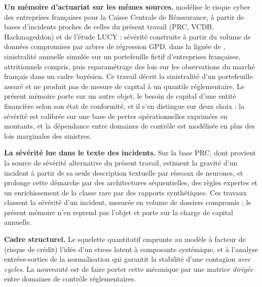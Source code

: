 \textbf{Un mémoire d'actuariat sur les mêmes sources.} \citet{Ranguin2024} modélise le risque
cyber des entreprises françaises pour la Caisse Centrale de Réassurance, à partir de bases
d'incidents proches de celles du présent travail (PRC, VCDB, Hackmageddon) et de l'étude LUCY :
sévérité construite à partir du volume de données compromises par arbres de régression GPD, dans
la lignée de \citet{FarkasLopezThomas2021}, sinistralité annuelle simulée sur un portefeuille
fictif d'entreprises françaises, attritionnels compris, puis reparamétrage des lois sur les
observations du marché français dans un cadre bayésien. Ce travail décrit la sinistralité d'un
portefeuille assuré et ne produit pas de mesure de capital à un quantile réglementaire. Le
présent mémoire porte sur un autre objet, le besoin de capital d'une entité financière selon son
état de conformité, et il s'en distingue sur deux choix : la sévérité est calibrée sur une base de
pertes opérationnelles exprimées en montants, et la dépendance entre domaines de contrôle est
modélisée en plus des lois marginales des sinistres.

\textbf{La sévérité lue dans le texte des incidents.} Sur la base PRC, dont provient la source de
sévérité alternative du présent travail, \citet{KherLopezRapior2023} estiment la gravité d'un
incident à partir de sa seule description textuelle par réseaux de neurones, et
\citet{Dountio2026} prolonge cette démarche par des architectures séquentielles, des règles
expertes et un enrichissement de la classe rare par des rapports synthétiques. Ces travaux
classent la sévérité d'un incident, mesurée en volume de dossiers compromis ; le présent mémoire
n'en reprend pas l'objet et porte sur la charge de capital annuelle.

\textbf{Cadre structurel.} Le squelette quantitatif emprunte au modèle à facteur de
\citet{Vasicek2002} (risque de crédit) l'idée d'un stress latent à composante systémique, et
à l'analyse entrées-sorties de \citet{Leontief1936} la normalisation qui garantit la
stabilité d'une contagion
\emph{avec cycles}. La nouveauté est de faire porter cette mécanique par une matrice
\emph{dirigée} entre domaines de contrôle réglementaires.

